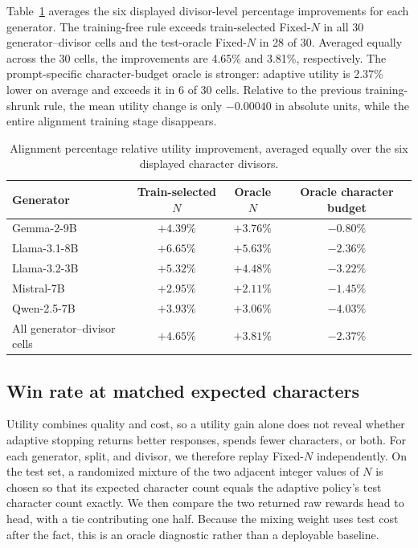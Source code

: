 Table~\ref{tab:alignment-summary} averages the six displayed divisor-level
percentage improvements for each generator.  The training-free rule exceeds
train-selected Fixed-$N$ in all 30 generator--divisor cells and the
test-oracle Fixed-$N$ in 28 of 30.  Averaged equally across the 30 cells, the
improvements are 4.65\% and 3.81\%, respectively.  The prompt-specific
character-budget oracle is stronger: adaptive utility is 2.37\% lower on
average and exceeds it in 6 of 30 cells.  Relative to the previous
training-shrunk rule, the mean utility change is only $-0.00040$ in absolute
units, while the entire alignment training stage disappears.

\begin{table}[H]
\centering
\small
\begin{tabular}{lccc}
\toprule
Generator & Train-selected $N$ & Oracle $N$ & Oracle character budget\\
\midrule
Gemma-2-9B   & $+4.39\%$ & $+3.76\%$ & $-0.80\%$\\
Llama-3.1-8B & $+6.65\%$ & $+5.63\%$ & $-2.36\%$\\
Llama-3.2-3B & $+5.32\%$ & $+4.48\%$ & $-3.22\%$\\
Mistral-7B   & $+2.95\%$ & $+2.11\%$ & $-1.45\%$\\
Qwen-2.5-7B  & $+3.93\%$ & $+3.06\%$ & $-4.03\%$\\
\midrule
All generator--divisor cells & $+4.65\%$ & $+3.81\%$ & $-2.37\%$\\
\bottomrule
\end{tabular}
\caption{Alignment percentage relative utility improvement, averaged equally
over the six displayed character divisors.}
\label{tab:alignment-summary}
\end{table}

\subsection{Win rate at matched expected characters}
\label{sec:alignment-win-rate}

Utility combines quality and cost, so a utility gain alone does not reveal
whether adaptive stopping returns better responses, spends fewer characters,
or both.  For each generator, split, and divisor, we therefore replay
Fixed-$N$ independently.  On the test set, a randomized mixture of the two
adjacent integer values of $N$ is chosen so that its expected character count
equals the adaptive policy's test character count exactly.  We then compare
the two returned raw rewards head to head, with a tie contributing one half.
Because the mixing weight uses test cost after the fact, this is an oracle
diagnostic rather than a deployable baseline.

